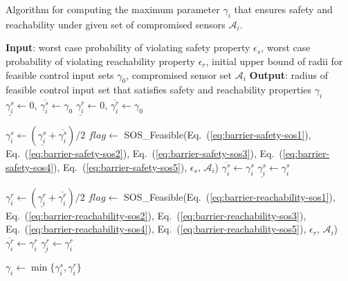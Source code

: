 \documentclass[journal]{IEEEtran}
\begin{document}
\begin{algorithm}[h]
	\caption{Algorithm for computing the maximum parameter $\gamma_i$ that ensures safety and reachability under given set of compromised sensors $\mathcal{A}_i$.}
	\label{algo:barrier-certificate}
	\begin{algorithmic}[1]
		\State \textbf{Input}: worst case probability of violating safety
		property $\epsilon_s$, worst case probability of violating reachability property $\epsilon_r$, initial upper bound of radii for feasible control input sets $\gamma_{0}$, compromised sensor set $\mathcal{A}_i$
		\State \textbf{Output}: radius of feasible control input set that satisfies safety and reachability properties $\gamma_i$
        \State $\underline{\gamma_i^s} \leftarrow 0$, $\overline{\gamma_i^s} \leftarrow \gamma_{0}$
        \State $\underline{\gamma_i^r} \leftarrow 0$, $\overline{\gamma_i^r} \leftarrow \gamma_{0}$
        
        \State $\gamma_i^s \leftarrow (\underline{\gamma_i^s} + \overline{\gamma_i^s})/2$
        \State $flag \leftarrow$ SOS\_Feasible(Eq.~(\ref{eq:barrier-safety-sos1}), Eq.~(\ref{eq:barrier-safety-sos2}), Eq.~(\ref{eq:barrier-safety-sos3}), Eq.~(\ref{eq:barrier-safety-sos4}), Eq.~(\ref{eq:barrier-safety-sos5}), $\epsilon_s$, $\mathcal{A}_i$)
        \State $\overline{\gamma_i^s} \leftarrow \gamma_i^s$
        \Else
        \State $\underline{\gamma_i^s} \leftarrow \gamma_i^s$
        \EndIf
        \EndWhile
        
        \State $\gamma_i^r \leftarrow (\underline{\gamma_i^r} + \overline{\gamma_i^r})/2$
        \State $flag \leftarrow$ SOS\_Feasible(Eq.~(\ref{eq:barrier-reachability-sos1}), Eq.~(\ref{eq:barrier-reachability-sos2}), Eq.~(\ref{eq:barrier-reachability-sos3}), Eq.~(\ref{eq:barrier-reachability-sos4}), Eq.~(\ref{eq:barrier-reachability-sos5}), $\epsilon_r$, $\mathcal{A}_i$)
        \State $\overline{\gamma_i^r} \leftarrow \gamma_i^r$
        \Else
        \State $\underline{\gamma_i^r} \leftarrow \gamma_i^r$
        \EndIf
        \EndWhile
        
        \State $\gamma_i \leftarrow \min \{\gamma_i^s, \gamma_i^r\}$
        \State {}
            \EndProcedure
	\end{algorithmic}
\end{algorithm}
\end{document}
